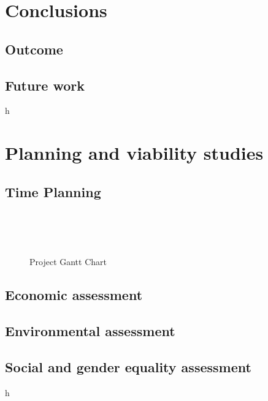 \documentclass[a4paper,11pt, titlepage, twoside]{article}
\begin{document}
\section{Conclusions}\label{Conclusions}
\subsection{Outcome}
\subsection{Future work}
h
\section{Planning and viability studies}\label{Planning}

\subsection{Time Planning}
\begin{figure}[h]
\begin{center}
\begin{ganttchart}{1}{20}
     \\
         \\
     \\
\end{ganttchart}
\caption{Project Gantt Chart}
\label{fig:gantt}
\end{center}
\end{figure}

\subsection{Economic assessment}
\subsection{Environmental assessment}
\subsection{Social and gender equality assessment}
h
\end{document}
